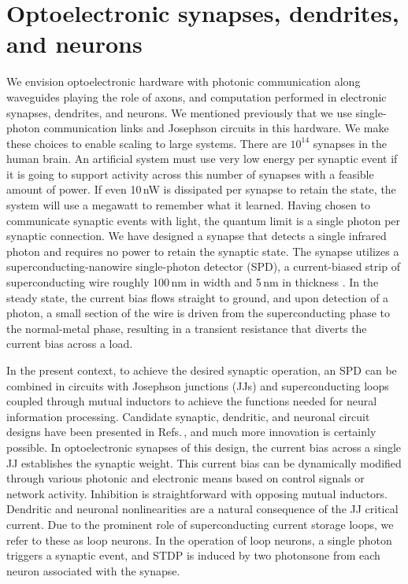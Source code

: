 \documentclass[twocolumn]{article}
\begin{document}
\section{\label{sec:synapsesDendritesAndNeurons}Optoelectronic synapses, dendrites, and neurons}
We envision optoelectronic hardware with photonic communication along waveguides playing the role of axons, and computation performed in electronic synapses, dendrites, and neurons. We mentioned previously that we use single-photon communication links and Josephson circuits in this hardware. We make these choices to enable scaling to large systems. There are $10^{14}$ synapses in the human brain. An artificial system must use very low energy per synaptic event if it is going to support activity across this number of synapses with a feasible amount of power. If even 10\,nW is dissipated per synapse to retain the state, the system will use a megawatt to remember what it learned. Having chosen to communicate synaptic events with light, the quantum limit is a single photon per synaptic connection. We have designed a synapse that detects a single infrared photon and requires no power to retain the synaptic state. The synapse utilizes a superconducting-nanowire single-photon detector (SPD), a current-biased strip of superconducting wire roughly 100\,nm in width and 5\,nm in thickness \cite{mave2013}. In the steady state, the current bias flows straight to ground, and upon detection of a photon, a small section of the wire is driven from the superconducting phase to the normal-metal phase, resulting in a transient resistance that diverts the current bias across a load.

In the present context, to achieve the desired synaptic operation, an SPD can be combined in circuits with Josephson junctions (JJs) and superconducting loops coupled through mutual inductors to achieve the functions needed for neural information processing. Candidate synaptic, dendritic, and neuronal circuit designs have been presented in Refs.\,\cite{sh2018,sh2018_full}, and much more innovation is certainly possible. In optoelectronic synapses of this design, the current bias across a single JJ establishes the synaptic weight. This current bias can be dynamically modified through various photonic and electronic means based on control signals or network activity. Inhibition is straightforward with opposing mutual inductors. Dendritic and neuronal nonlinearities are a natural consequence of the JJ critical current. Due to the prominent role of superconducting current storage loops, we refer to these as loop neurons. In the operation of loop neurons, a single photon triggers a synaptic event, and STDP is induced by two photons\textemdash one from each neuron associated with the synapse.
\end{document}
